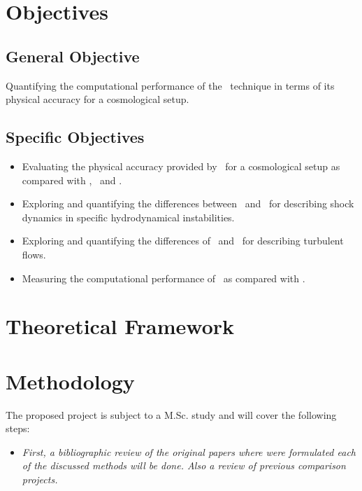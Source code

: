 \documentclass[a4,useAMS,usenatbib,usegraphicx,12pt]{article}
\begin{document}
\section{Objectives}
\subsection*{General Objective}
Quantifying the computational performance of the \VPH\ technique in terms of 
its physical accuracy for a cosmological setup.


\subsection*{Specific Objectives}
\begin{itemize}
\item Evaluating the physical accuracy provided by \VPH\ for a cosmological 
setup as compared with \AMR, \SPH\ and \AREPO.
\item Exploring and quantifying the differences between \VPH\ and \AMR\ for 
describing shock dynamics in specific hydrodynamical instabilities.
\item Exploring and quantifying the differences of \VPH\ and \SPH\ for 
describing turbulent flows.
\item Measuring the computational performance of \VPH\ as compared with \AREPO.
\end{itemize}


\section{Theoretical Framework}


\section{Methodology}
The proposed project is subject to a M.Sc. study and will cover the following 
steps:


\begin{itemize}
\item[\checkmark] \textit{First, a bibliographic review of the original papers 
where were formulated each of the discussed methods will be done. Also a 
review of previous comparison projects.}
\end{itemize}
\end{document}

